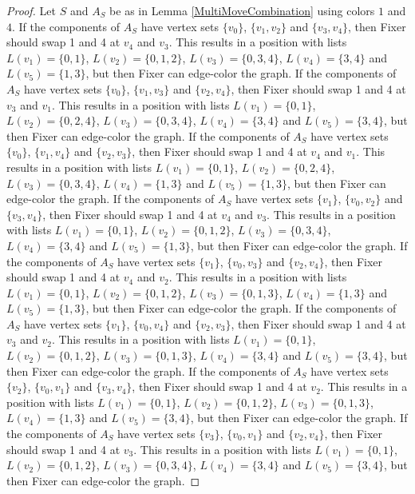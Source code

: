\documentclass[12pt]{amsart}
\theoremstyle{plain}
\theoremstyle{definition}
\theoremstyle{remark}
\begin{document}
\begin{proof}
Let $S$ and $A_S$ be as in Lemma \ref{MultiMoveCombination} using colors $1$ and $4$. If the components of $A_S$ have vertex sets $\{v_0\}$, $\{v_1, v_2\}$ and $\{v_3, v_4\}$, then Fixer should swap 1 and 4 at $v_4$ and $v_3$. This results in a position with lists $L(v_1) = \{0, 1\}$, $L(v_2) = \{0, 1, 2\}$, $L(v_3) = \{0, 3, 4\}$, $L(v_4) = \{3, 4\}$ and $L(v_5) = \{1, 3\}$, but then Fixer can edge-color the graph.
If the components of $A_S$ have vertex sets $\{v_0\}$, $\{v_1, v_3\}$ and $\{v_2, v_4\}$, then Fixer should swap 1 and 4 at $v_3$ and $v_1$. This results in a position with lists $L(v_1) = \{0, 1\}$, $L(v_2) = \{0, 2, 4\}$, $L(v_3) = \{0, 3, 4\}$, $L(v_4) = \{3, 4\}$ and $L(v_5) = \{3, 4\}$, but then Fixer can edge-color the graph.
If the components of $A_S$ have vertex sets $\{v_0\}$, $\{v_1, v_4\}$ and $\{v_2, v_3\}$, then Fixer should swap 1 and 4 at $v_4$ and $v_1$. This results in a position with lists $L(v_1) = \{0, 1\}$, $L(v_2) = \{0, 2, 4\}$, $L(v_3) = \{0, 3, 4\}$, $L(v_4) = \{1, 3\}$ and $L(v_5) = \{1, 3\}$, but then Fixer can edge-color the graph.
If the components of $A_S$ have vertex sets $\{v_1\}$, $\{v_0, v_2\}$ and $\{v_3, v_4\}$, then Fixer should swap 1 and 4 at $v_4$ and $v_3$. This results in a position with lists $L(v_1) = \{0, 1\}$, $L(v_2) = \{0, 1, 2\}$, $L(v_3) = \{0, 3, 4\}$, $L(v_4) = \{3, 4\}$ and $L(v_5) = \{1, 3\}$, but then Fixer can edge-color the graph.
If the components of $A_S$ have vertex sets $\{v_1\}$, $\{v_0, v_3\}$ and $\{v_2, v_4\}$, then Fixer should swap 1 and 4 at $v_4$ and $v_2$. This results in a position with lists $L(v_1) = \{0, 1\}$, $L(v_2) = \{0, 1, 2\}$, $L(v_3) = \{0, 1, 3\}$, $L(v_4) = \{1, 3\}$ and $L(v_5) = \{1, 3\}$, but then Fixer can edge-color the graph.
If the components of $A_S$ have vertex sets $\{v_1\}$, $\{v_0, v_4\}$ and $\{v_2, v_3\}$, then Fixer should swap 1 and 4 at $v_3$ and $v_2$. This results in a position with lists $L(v_1) = \{0, 1\}$, $L(v_2) = \{0, 1, 2\}$, $L(v_3) = \{0, 1, 3\}$, $L(v_4) = \{3, 4\}$ and $L(v_5) = \{3, 4\}$, but then Fixer can edge-color the graph.
If the components of $A_S$ have vertex sets $\{v_2\}$, $\{v_0, v_1\}$ and $\{v_3, v_4\}$, then Fixer should swap 1 and 4 at $v_2$. This results in a position with lists $L(v_1) = \{0, 1\}$, $L(v_2) = \{0, 1, 2\}$, $L(v_3) = \{0, 1, 3\}$, $L(v_4) = \{1, 3\}$ and $L(v_5) = \{3, 4\}$, but then Fixer can edge-color the graph.
If the components of $A_S$ have vertex sets $\{v_3\}$, $\{v_0, v_1\}$ and $\{v_2, v_4\}$, then Fixer should swap 1 and 4 at $v_3$. This results in a position with lists $L(v_1) = \{0, 1\}$, $L(v_2) = \{0, 1, 2\}$, $L(v_3) = \{0, 3, 4\}$, $L(v_4) = \{3, 4\}$ and $L(v_5) = \{3, 4\}$, but then Fixer can edge-color the graph.

\end{proof}
\end{document}
